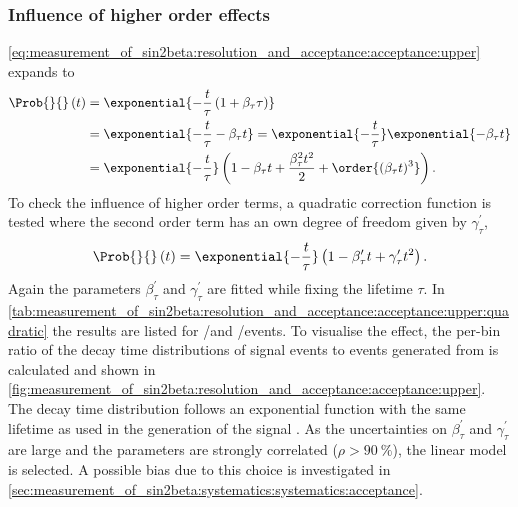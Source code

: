 \subsubsection*{Influence of higher order effects}

\cref{eq:measurement_of_sin2beta:resolution_and_acceptance:acceptance:upper}
expands to
%
\begin{equation}\label{eq:measurement_of_sin2beta:resolution_and_acceptance:acceptance:upper:linear}
\begin{split}
  \Prob{}{}\left(t\right) &= \exponential{-\frac{t}{\tau}\left(1+\beta_{\tau}\tau\right)} \\
                          &= \exponential{-\frac{t}{\tau}-\beta_{\tau}t} = \exponential{-\frac{t}{\tau}} \exponential{-\beta_{\tau}t} \\
                          &= \exponential{-\frac{t}{\tau}}\left(1-\beta_{\tau} t+\frac{\beta_{\tau}^2 t^2}{2}+\order{(\beta_{\tau} t)^3}\right).
\end{split}
\end{equation}
%
To check the influence of higher order terms, a quadratic correction function is
tested where the second order term has an own degree of freedom given by
$\gamma_\tau^\prime$,
%
\begin{equation}\label{eq:measurement_of_sin2beta:resolution_and_acceptance:acceptance:upper:quadratic}
  \Prob{}{}\left(t\right) = \exponential{-\frac{t}{\tau}}\left(1-\beta_\tau^\prime t+ \gamma_\tau^\prime t^2\right).
\end{equation}
%
Again the parameters $\beta_\tau^\prime$ and $\gamma_\tau^\prime$ are fitted
while fixing the lifetime $\tau$. In \cref{tab:measurement_of_sin2beta:resolution_and_acceptance:acceptance:upper:quadratic} 
the results are listed for \catOO/\catOT and \catDD/\catLL events. To visualise
the effect, the per-bin ratio of the decay time distributions of signal \MC
events to events generated from \ToyMC is calculated and shown in
\cref{fig:measurement_of_sin2beta:resolution_and_acceptance:acceptance:upper}.
The \ToyMC decay time distribution follows an exponential function with the same
lifetime as used in the generation of the signal \MC. As the uncertainties on
$\beta_\tau^\prime$ and $\gamma_\tau^\prime$ are large and the parameters are
strongly correlated ($\rho>\SI{90}{\percent}$), the linear model is selected. A
possible bias due to this choice is investigated in
\cref{sec:measurement_of_sin2beta:systematics:systematics:acceptance}.
%
